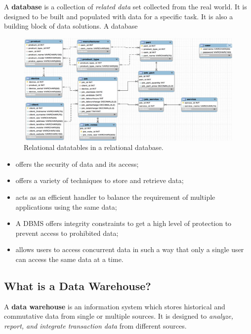 \documentclass[
]{book}
\providecommand{\tightlist}{%
  \setlength{\itemsep}{0pt}\setlength{\parskip}{0pt}}
\begin{document}
A \textbf{database} is a collection of \emph{related data} set collected from the real world. It is designed to be built and populated with data for a specific task. It is also a building block of data solutions. A database

\begin{figure}

{\centering \includegraphics[width=0.99\linewidth]{img01/w01-relationalTables} 

}

\caption{Relational datatables in a relational database.}\label{fig:unnamed-chunk-8}
\end{figure}

\begin{itemize}
\tightlist
\item
  offers the security of data and its access;
\item
  offers a variety of techniques to store and retrieve data;
\item
  acts as an efficient handler to balance the requirement of multiple applications using the same data;
\item
  A DBMS offers integrity constraints to get a high level of protection to prevent access to prohibited data;
\item
  allows users to access concurrent data in such a way that only a single user can access the same data at a time.
\end{itemize}

\hypertarget{what-is-a-data-warehouse}{%
\subsection{What is a Data Warehouse?}\label{what-is-a-data-warehouse}}

A \textbf{data warehouse} is an information system which stores historical and commutative data from single or multiple sources. It is designed to \emph{analyze, report, and integrate transaction data} from different sources.
\end{document}
